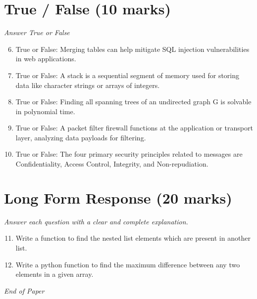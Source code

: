 \documentclass[12pt]{article}
\begin{document}
\section*{True / False (10 marks)}
\textit{Answer True or False}
\begin{enumerate}[label=\arabic*.]
\setcounter{enumi}{5}
\item True or False: Merging tables can help mitigate SQL injection vulnerabilities in web applications.
\item True or False: A stack is a sequential segment of memory used for storing data like character strings or arrays of integers.
\item True or False: Finding all spanning trees of an undirected graph G is solvable in polynomial time.
\item True or False: A packet filter firewall functions at the application or transport layer, analyzing data payloads for filtering.
\item True or False: The four primary security principles related to messages are Confidentiality, Access Control, Integrity, and Non-repudiation.
\end{enumerate}

\section*{Long Form Response (20 marks)}
\textit{Answer each question with a clear and complete explanation.}
\begin{enumerate}[label=\arabic*.]
\setcounter{enumi}{10}
\item Write a function to find the nested list elements which are present in another list.
\item Write a python function to find the maximum difference between any two elements in a given array.
\end{enumerate}

\vfill
\noindent\textit{End of Paper}
\end{document}
